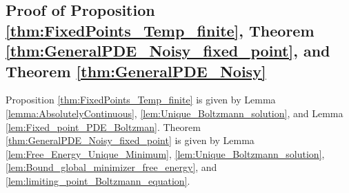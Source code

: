 \documentclass[11pt]{article}
\renewcommand{\eqref}[1]{(\ref{#1})}
\begin{document}
%
%
%
%
%
%
%
%



\subsection{Proof of Proposition \ref{thm:FixedPoints_Temp_finite}, Theorem \ref{thm:GeneralPDE_Noisy_fixed_point}, and Theorem \ref{thm:GeneralPDE_Noisy}}
\label{sec:Proof_finite_T}


Proposition \ref{thm:FixedPoints_Temp_finite} is given by Lemma \ref{lemma:AbsolutelyContinuous}, \ref{lem:Unique_Boltzmann_solution}, and Lemma \ref{lem:Fixed_point_PDE_Boltzman}. 
Theorem \ref{thm:GeneralPDE_Noisy_fixed_point} is given by Lemma \ref{lem:Free_Energy_Unique_Minimum}, \ref{lem:Unique_Boltzmann_solution}, \ref{lem:Bound_global_minimizer_free_energy}, and \ref{lem:limiting_point_Boltzmann_equation}.  
\end{document}
